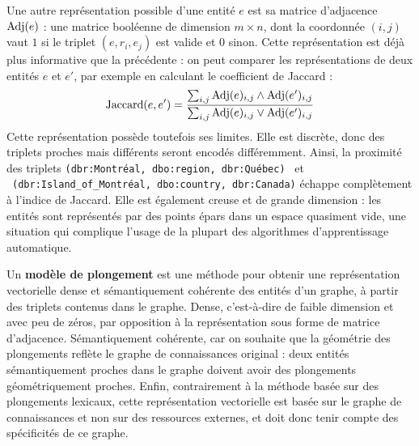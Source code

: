 Une autre représentation possible d'une entité $e$ est sa matrice d'adjacence $\operatorname{Adj}(e)$ \cite{hoser2006semantic}: une matrice booléenne de dimension $m \times n$, dont la coordonnée $(i, j)$ vaut $1$ si le triplet $(e, r_i, e_j)$ est valide et $0$ sinon. Cette représentation est déjà plus informative que la précédente : on peut comparer les représentations de deux entités $e$ et $e'$, par exemple en calculant le coefficient de Jaccard :
\begin{equation}
    \operatorname{Jaccard}(e, e') = \frac{\sum_{i, j} \operatorname{Adj}(e)_{i, j} \land \operatorname{Adj}(e')_{i, j}}{\sum_{i, j} \operatorname{Adj}(e)_{i, j} \lor \operatorname{Adj}(e')_{i, j}}    
\end{equation}
Cette représentation possède toutefois ses limites. Elle est discrète, donc des triplets proches mais différents seront encodés différemment. Ainsi, la proximité des triplets \texttt{(dbr:Montréal, dbo:region,  dbr:Québec)} \ et \ \texttt{(dbr:Island\_of\_Montréal,  dbo:country, dbr:Canada)} échappe complètement à l'indice de Jaccard. Elle est également creuse et de grande dimension : les entités sont représentés par des points épars dans un espace quasiment vide, une situation qui complique l'usage de la plupart des algorithmes d'apprentissage automatique.






Un \textbf{modèle de plongement} est une méthode pour obtenir une représentation vectorielle dense et sémantiquement cohérente des entités d'un graphe, à partir des triplets contenus dans le graphe. Dense, c'est-à-dire de faible dimension et avec peu de zéros, par opposition à la représentation sous forme de matrice d'adjacence. Sémantiquement cohérente, car on souhaite que la géométrie des plongements reflète le graphe de connaissances original : deux entités sémantiquement proches dans le graphe doivent avoir des plongements géométriquement proches. Enfin, contrairement à la méthode basée sur des plongements lexicaux, cette représentation vectorielle est basée sur le graphe de connaissances et non sur des ressources externes, et doit donc tenir compte des spécificités de ce graphe.

